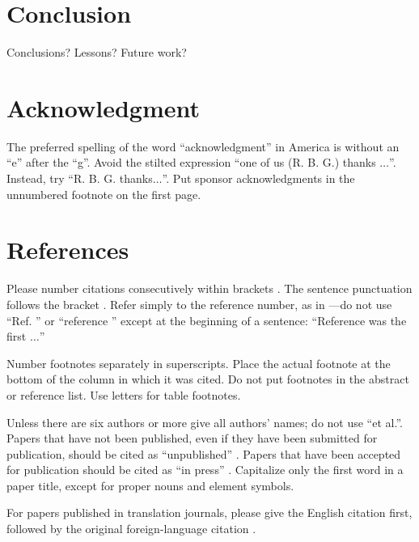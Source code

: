 \documentclass[conference]{IEEEtran}
\begin{document}
\section{Conclusion}
Conclusions? Lessons? Future work?


\section*{Acknowledgment}

The preferred spelling of the word ``acknowledgment'' in America is without 
an ``e'' after the ``g''. Avoid the stilted expression ``one of us (R. B. 
G.) thanks $\ldots$''. Instead, try ``R. B. G. thanks$\ldots$''. Put sponsor 
acknowledgments in the unnumbered footnote on the first page.

\section*{References}

Please number citations consecutively within brackets \cite{b1}. The 
sentence punctuation follows the bracket \cite{b2}. Refer simply to the reference 
number, as in \cite{b3}---do not use ``Ref. \cite{b3}'' or ``reference \cite{b3}'' except at 
the beginning of a sentence: ``Reference \cite{b3} was the first $\ldots$''

Number footnotes separately in superscripts. Place the actual footnote at 
the bottom of the column in which it was cited. Do not put footnotes in the 
abstract or reference list. Use letters for table footnotes.

Unless there are six authors or more give all authors' names; do not use 
``et al.''. Papers that have not been published, even if they have been 
submitted for publication, should be cited as ``unpublished'' \cite{b4}. Papers 
that have been accepted for publication should be cited as ``in press'' \cite{b5}. 
Capitalize only the first word in a paper title, except for proper nouns and 
element symbols.

For papers published in translation journals, please give the English 
citation first, followed by the original foreign-language citation \cite{b6}.
\end{document}
